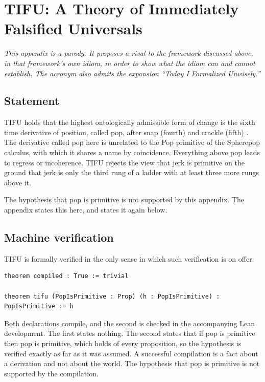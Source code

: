 \documentclass[11pt]{article}
\begin{document}
\appendix
\section{TIFU: A Theory of Immediately Falsified Universals}
\label{app:tifu}

\noindent\emph{This appendix is a parody. It proposes a rival to the framework discussed above, in that framework's own idiom, in order to show what the idiom can and cannot establish. The acronym also admits the expansion ``Today I Formalized Unwisely.''}

\subsection{Statement}

TIFU holds that the highest ontologically admissible form of change is the sixth time derivative of position, called pop, after snap (fourth) and crackle (fifth) \cite{visser2004,eager2016}. The derivative called pop here is unrelated to the Pop primitive of the Spherepop calculus, with which it shares a name by coincidence. Everything above pop leads to regress or incoherence. TIFU rejects the view that jerk is primitive on the ground that jerk is only the third rung of a ladder with at least three more rungs above it.

The hypothesis that pop is primitive is not supported by this appendix. The appendix states this here, and states it again below.

\subsection{Machine verification}

TIFU is formally verified in the only sense in which such verification is on offer:
\begin{lstlisting}
theorem compiled : True := trivial

theorem tifu (PopIsPrimitive : Prop) (h : PopIsPrimitive) : PopIsPrimitive := h
\end{lstlisting}
Both declarations compile, and the second is checked in the accompanying Lean development. The first states nothing. The second states that if pop is primitive then pop is primitive, which holds of every proposition, so the hypothesis is verified exactly as far as it was assumed. A successful compilation is a fact about a derivation and not about the world. The hypothesis that pop is primitive is not supported by the compilation.
\end{document}
